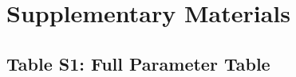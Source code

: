 
\appendix
\setcounter{table}{0}
\setcounter{figure}{0}
\renewcommand{\thetable}{S\arabic{table}}
\renewcommand{\thefigure}{S\arabic{figure}}

\section*{Supplementary Materials}

\subsection*{Table S1: Full Parameter Table}

